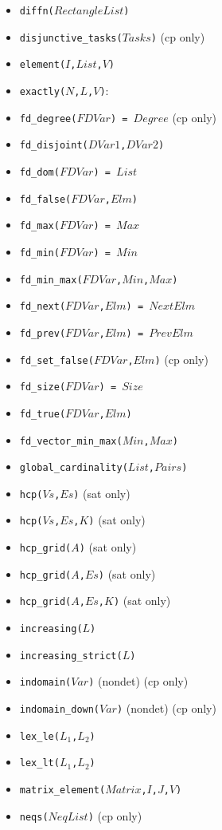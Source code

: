 \documentclass[10pt]{article}
\begin{document}
\begin{multicols}{2}
\begin{scriptsize}
\begin{itemize}
\item \texttt{diffn($RectangleList$)}
\item \texttt{disjunctive\_tasks($Tasks$)} (cp only)
\item \texttt{element($I$,$List$,$V$)}
\item \texttt{exactly($N$,$L$,$V$)}:
\item \texttt{fd\_degree($FDVar$) = $Degree$} (cp only)
\item \texttt{fd\_disjoint($DVar1$,$DVar2$)} 
\item \texttt{fd\_dom($FDVar$) = $List$}
\item \texttt{fd\_false($FDVar$,$Elm$)}
\item \texttt{fd\_max($FDVar$) = $Max$}
\item \texttt{fd\_min($FDVar$) = $Min$}
\item \texttt{fd\_min\_max($FDVar$,$Min$,$Max$)}
\item \texttt{fd\_next($FDVar$,$Elm$) = $NextElm$}
\item \texttt{fd\_prev($FDVar$,$Elm$) = $PrevElm$}
\item \texttt{fd\_set\_false($FDVar$,$Elm$)} (cp only)
\item \texttt{fd\_size($FDVar$) = $Size$}
\item \texttt{fd\_true($FDVar$,$Elm$)}
\item \texttt{fd\_vector\_min\_max($Min$,$Max$)}
\item \texttt{global\_cardinality($List$,$Pairs$)}
\item \texttt{hcp($Vs$,$Es$)} (sat only)
\item \texttt{hcp($Vs$,$Es$,$K$)} (sat only)
\item \texttt{hcp\_grid($A$)} (sat only)
\item \texttt{hcp\_grid($A$,$Es$)} (sat only)
\item \texttt{hcp\_grid($A$,$Es$,$K$)} (sat only)
\item \texttt{increasing($L$)}
\item \texttt{increasing\_strict($L$)}
\item \texttt{indomain($Var$)} (nondet) (cp only)
\item \texttt{indomain\_down($Var$)} (nondet) (cp only)
\item \texttt{lex\_le($L_1$,$L_2$)}
\item \texttt{lex\_lt($L_1$,$L_2$)}
\item \texttt{matrix\_element($Matrix$,$I$,$J$,$V$)}
\item \texttt{neqs($NeqList$)} (cp only)

\end{itemize}
\end{scriptsize}
\end{multicols}
\end{document}
